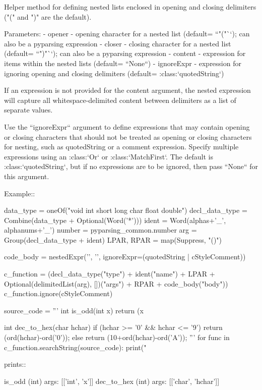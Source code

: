 \begin{DoxyVerb}Helper method for defining nested lists enclosed in opening and
closing delimiters ("(" and ")" are the default).

Parameters:
 - opener - opening character for a nested list
   (default= ``"("``); can also be a pyparsing expression
 - closer - closing character for a nested list
   (default= ``")"``); can also be a pyparsing expression
 - content - expression for items within the nested lists
   (default= ``None``)
 - ignoreExpr - expression for ignoring opening and closing
   delimiters (default= :class:`quotedString`)

If an expression is not provided for the content argument, the
nested expression will capture all whitespace-delimited content
between delimiters as a list of separate values.

Use the ``ignoreExpr`` argument to define expressions that may
contain opening or closing characters that should not be treated as
opening or closing characters for nesting, such as quotedString or
a comment expression.  Specify multiple expressions using an
:class:`Or` or :class:`MatchFirst`. The default is
:class:`quotedString`, but if no expressions are to be ignored, then
pass ``None`` for this argument.

Example::

    data_type = oneOf("void int short long char float double")
    decl_data_type = Combine(data_type + Optional(Word('*')))
    ident = Word(alphas+'_', alphanums+'_')
    number = pyparsing_common.number
    arg = Group(decl_data_type + ident)
    LPAR, RPAR = map(Suppress, "()")

    code_body = nestedExpr('{', '}', ignoreExpr=(quotedString | cStyleComment))

    c_function = (decl_data_type("type")
                  + ident("name")
                  + LPAR + Optional(delimitedList(arg), [])("args") + RPAR
                  + code_body("body"))
    c_function.ignore(cStyleComment)

    source_code = '''
        int is_odd(int x) {
            return (x%
        }

        int dec_to_hex(char hchar) {
            if (hchar >= '0' && hchar <= '9') {
                return (ord(hchar)-ord('0'));
            } else {
                return (10+ord(hchar)-ord('A'));
            }
        }
    '''
    for func in c_function.searchString(source_code):
        print("%


prints::

    is_odd (int) args: [['int', 'x']]
    dec_to_hex (int) args: [['char', 'hchar']]
\end{DoxyVerb}
 \mbox{\label{namespacepip_1_1__vendor_1_1pyparsing_a76237e0aef3ce1c4789118b9ec72eac0}} 
